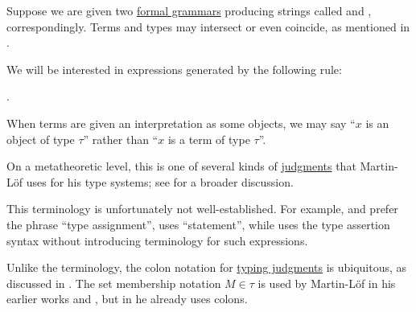 \begin{definition}\label{def:type_assertion}\mimprovised
  Suppose we are given two \hyperref[def:formal_grammar/schema]{formal grammars} producing strings called  and , correspondingly. Terms and types may intersect or even coincide, as mentioned in .

  We will be interested in expressions generated by the following rule:
  \begin{bnf*}
     { \bnfsp \bnftsq{\( : \)} \bnfsp {}}.
  \end{bnf*}
\end{definition}
\begin{comments}
  \item When terms are given an interpretation as some objects, we may say \enquote{\( x \) is an object of type \( \tau \)} rather than \enquote{\( x \) is a term of type \( \tau \)}.

  \item On a metatheoretic level, this is one of several kinds of \hyperref[con:judgment]{judgments} that Martin-L\"of uses for his type systems; see  for a broader discussion.

  \item This terminology is unfortunately not well-established. For example,  and  prefer the phrase \enquote{type assignment},  uses \enquote{statement}, while  uses the type assertion syntax without introducing terminology for such expressions.

  \item Unlike the terminology, the colon notation for \hyperref[rem:typing_judgments]{typing judgments} is ubiquitous, as discussed in \cite{MathSE:origin_of_colon_notation_for_type_assertions}. The set membership notation \( M \in \tau \) is used by Martin-L\"of in his earlier works \cite{MartinLöf1975IntuitionisticTypeTheory} and \cite{MartinLöf1984IntuitionisticTypeTheory}, but in \cite{MartinLöf1994TypeJudgments} he already uses colons.
\end{comments}

